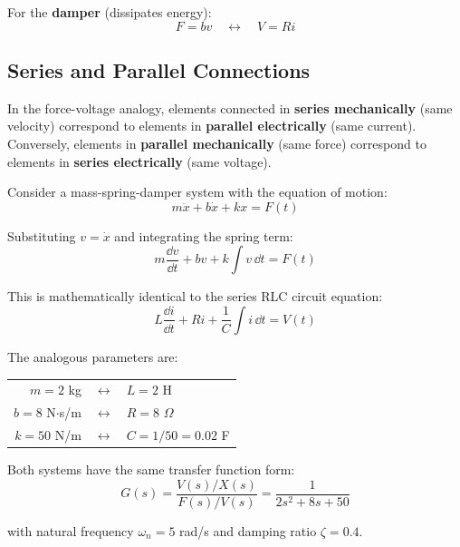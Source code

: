 For the \textbf{damper} (dissipates energy):
\begin{equation}
F = bv \quad \longleftrightarrow \quad V = Ri
\end{equation}

\subsection{Series and Parallel Connections}

In the force-voltage analogy, elements connected in \textbf{series mechanically} (same velocity) correspond to elements in \textbf{parallel electrically} (same current). Conversely, elements in \textbf{parallel mechanically} (same force) correspond to elements in \textbf{series electrically} (same voltage).

\begin{examplebox}[title=Example 5.1: Mass-Spring-Damper to Series RLC Circuit]
Consider a mass-spring-damper system with the equation of motion:
\begin{equation}
m\ddot{x} + b\dot{x} + kx = F(t)
\end{equation}

Substituting $v = \dot{x}$ and integrating the spring term:
\begin{equation}
m\frac{\dd v}{\dd t} + bv + k\int v \, \dd t = F(t)
\end{equation}

This is mathematically identical to the series RLC circuit equation:
\begin{equation}
L\frac{\dd i}{\dd t} + Ri + \frac{1}{C}\int i \, \dd t = V(t)
\end{equation}

The analogous parameters are:
\begin{center}
\begin{tabular}{rcl}
$m = 2$ kg & $\longleftrightarrow$ & $L = 2$ H \\
$b = 8$ N$\cdot$s/m & $\longleftrightarrow$ & $R = 8$ $\Omega$ \\
$k = 50$ N/m & $\longleftrightarrow$ & $C = 1/50 = 0.02$ F
\end{tabular}
\end{center}

Both systems have the same transfer function form:
\begin{equation}
G(s) = \frac{V(s)/X(s)}{F(s)/V(s)} = \frac{1}{2s^2 + 8s + 50}
\end{equation}

with natural frequency $\omega_n = 5$ rad/s and damping ratio $\zeta = 0.4$.
\end{examplebox}


